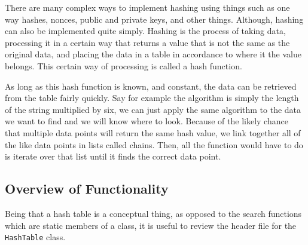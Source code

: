 \documentclass[letterpaper, 10pt]{article}
\begin{document}
There are many complex ways to implement hashing using things such as one way hashes, nonces, public and private keys, and other things. Although, hashing can also be implemented quite simply. Hashing is the process of taking data, processing it in a certain way that returns a value that is not the same as the original data, and placing the data in a table in accordance to where it the value belongs. This certain way of processing is called a hash function.

As long as this hash function is known, and constant, the data can be retrieved from the table fairly quickly. Say for example the algorithm is simply the length of the string multiplied by six, we can just apply the same algorithm to the data we want to find and we will know where to look. Because of the likely chance that multiple data points will return the same hash value, we link together all of the like data points in lists called chains. Then, all the function would have to do is iterate over that list until it finds the correct data point.

\subsection{Overview of Functionality}

Being that a hash table is a conceptual thing, as opposed to the search functions which are static members of a class, it is useful to review the header file for the \texttt{HashTable} class.
\end{document}
